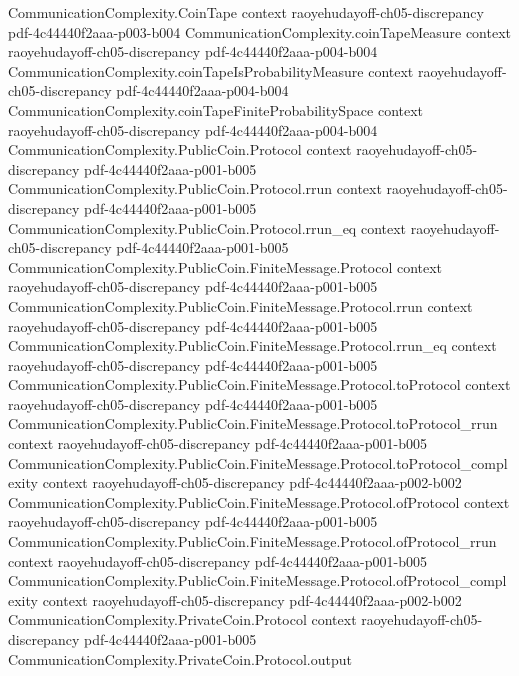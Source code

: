 \begin{lemma}
  {CommunicationComplexity.CoinTape}
  {context}
  {raoyehudayoff-ch05-discrepancy}
  {pdf-4c44440f2aaa-p003-b004}
\proofstep
  {CommunicationComplexity.coinTapeMeasure}
  {context}
  {raoyehudayoff-ch05-discrepancy}
  {pdf-4c44440f2aaa-p004-b004}
\proofstep
  {CommunicationComplexity.coinTapeIsProbabilityMeasure}
  {context}
  {raoyehudayoff-ch05-discrepancy}
  {pdf-4c44440f2aaa-p004-b004}
\proofstep
  {CommunicationComplexity.coinTapeFiniteProbabilitySpace}
  {context}
  {raoyehudayoff-ch05-discrepancy}
  {pdf-4c44440f2aaa-p004-b004}
\proofstep
  {CommunicationComplexity.PublicCoin.Protocol}
  {context}
  {raoyehudayoff-ch05-discrepancy}
  {pdf-4c44440f2aaa-p001-b005}
\proofstep
  {CommunicationComplexity.PublicCoin.Protocol.rrun}
  {context}
  {raoyehudayoff-ch05-discrepancy}
  {pdf-4c44440f2aaa-p001-b005}
\proofstep
  {CommunicationComplexity.PublicCoin.Protocol.rrun_eq}
  {context}
  {raoyehudayoff-ch05-discrepancy}
  {pdf-4c44440f2aaa-p001-b005}
\proofstep
  {CommunicationComplexity.PublicCoin.FiniteMessage.Protocol}
  {context}
  {raoyehudayoff-ch05-discrepancy}
  {pdf-4c44440f2aaa-p001-b005}
\proofstep
  {CommunicationComplexity.PublicCoin.FiniteMessage.Protocol.rrun}
  {context}
  {raoyehudayoff-ch05-discrepancy}
  {pdf-4c44440f2aaa-p001-b005}
\proofstep
  {CommunicationComplexity.PublicCoin.FiniteMessage.Protocol.rrun_eq}
  {context}
  {raoyehudayoff-ch05-discrepancy}
  {pdf-4c44440f2aaa-p001-b005}
\proofstep
  {CommunicationComplexity.PublicCoin.FiniteMessage.Protocol.toProtocol}
  {context}
  {raoyehudayoff-ch05-discrepancy}
  {pdf-4c44440f2aaa-p001-b005}
\proofstep
  {CommunicationComplexity.PublicCoin.FiniteMessage.Protocol.toProtocol_rrun}
  {context}
  {raoyehudayoff-ch05-discrepancy}
  {pdf-4c44440f2aaa-p001-b005}
\proofstep
  {CommunicationComplexity.PublicCoin.FiniteMessage.Protocol.toProtocol_complexity}
  {context}
  {raoyehudayoff-ch05-discrepancy}
  {pdf-4c44440f2aaa-p002-b002}
\proofstep
  {CommunicationComplexity.PublicCoin.FiniteMessage.Protocol.ofProtocol}
  {context}
  {raoyehudayoff-ch05-discrepancy}
  {pdf-4c44440f2aaa-p001-b005}
\proofstep
  {CommunicationComplexity.PublicCoin.FiniteMessage.Protocol.ofProtocol_rrun}
  {context}
  {raoyehudayoff-ch05-discrepancy}
  {pdf-4c44440f2aaa-p001-b005}
\proofstep
  {CommunicationComplexity.PublicCoin.FiniteMessage.Protocol.ofProtocol_complexity}
  {context}
  {raoyehudayoff-ch05-discrepancy}
  {pdf-4c44440f2aaa-p002-b002}
\proofstep
  {CommunicationComplexity.PrivateCoin.Protocol}
  {context}
  {raoyehudayoff-ch05-discrepancy}
  {pdf-4c44440f2aaa-p001-b005}
\proofstep
  {CommunicationComplexity.PrivateCoin.Protocol.output}

\end{lemma}
